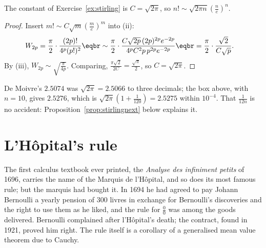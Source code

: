 \begin{theorem}\label{thm:stirlingC}
The constant of Exercise~\ref{ex:stirling} is $C=\sqrt{2\pi}$, so $n!\sim\sqrt{2\pi n}\left(\frac ne\right)^n$.
\end{theorem}
\begin{proof}
Insert $m!\sim C\sqrt m\left(\frac me\right)^m$ into (ii):
\[
\begin{aligned}W_{2p}&=\frac\pi2\cdot\frac{(2p)!}{4^p(p!)^2}\eqbr\sim\frac\pi2\cdot\frac{C\sqrt{2p}\,(2p)^{2p}e^{-2p}}{4^pC^2p\,p^{2p}e^{-2p}}\eqbr=\frac\pi2\cdot\frac{\sqrt2}{C\sqrt p}.\end{aligned}
\]
By (iii), $W_{2p}\sim\sqrt{\frac\pi{4p}}$. Comparing, $\frac{\pi\sqrt2}{2C}=\frac{\sqrt\pi}2$, so $C=\sqrt{2\pi}$.
\end{proof}

De Moivre's $2.5074$ was $\sqrt{2\pi}=2.5066$ to three decimals; the box above, with $n=10$, gives $2.5276$, which is $\sqrt{2\pi}\left(1+\frac1{120}\right)=2.5275$ within $10^{-4}$. That $\frac1{12n}$ is no accident: Proposition~\ref{prop:stirlingnext} below explains it.

\section{L'H\^opital's rule}

The first calculus textbook ever printed, the \emph{Analyse des infiniment petits} of 1696, carries the name of the Marquis de l'H\^opital, and so does
its most famous rule; but the marquis had bought it. In 1694 he had agreed to pay Johann Bernoulli a yearly pension of 300 livres in exchange for
Bernoulli's discoveries and the right to use them as he liked, and the rule for $\frac00$ was among the goods delivered. Bernoulli complained after
l'H\^opital's death; the contract, found in 1921, proved him right. The rule itself is a corollary of a generalised mean value theorem due to Cauchy.

